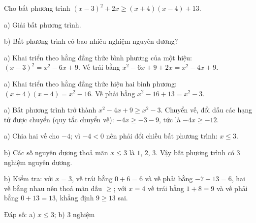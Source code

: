 \begin{problem}[9DS-BPT-039]
Cho bất phương trình $(x - 3)^2 + 2x \geq (x + 4)(x - 4) + 13$.

a) Giải bất phương trình.

b) Bất phương trình có bao nhiêu nghiệm nguyên dương?

\begin{solution}
a) Khai triển theo hằng đẳng thức bình phương của một hiệu: $(x - 3)^2 = x^2 - 6x + 9$. Vế trái bằng $x^2 - 6x + 9 + 2x = x^2 - 4x + 9$.

a) Khai triển theo hằng đẳng thức hiệu hai bình phương: $(x + 4)(x - 4) = x^2 - 16$. Vế phải bằng $x^2 - 16 + 13 = x^2 - 3$.

a) Bất phương trình trở thành $x^2 - 4x + 9 \geq x^2 - 3$. Chuyển vế, đổi dấu các hạng tử được chuyển (quy tắc chuyển vế): $-4x \geq -3 - 9$, tức là $-4x \geq -12$.

a) Chia hai vế cho $-4$; vì $-4 < 0$ nên phải đổi chiều bất phương trình: $x \leq 3$.

b) Các số nguyên dương thoả mãn $x \leq 3$ là $1$, $2$, $3$. Vậy bất phương trình có $3$ nghiệm nguyên dương.

b) Kiểm tra: với $x = 3$, vế trái bằng $0 + 6 = 6$ và vế phải bằng $-7 + 13 = 6$, hai vế bằng nhau nên thoả mãn dấu $\geq$; với $x = 4$ vế trái bằng $1 + 8 = 9$ và vế phải bằng $0 + 13 = 13$, khẳng định $9 \geq 13$ sai.

Đáp số: a) $\boxed{x \leq 3}$; b) $\boxed{3 \text{ nghiệm}}$
\end{solution}
\end{problem}

